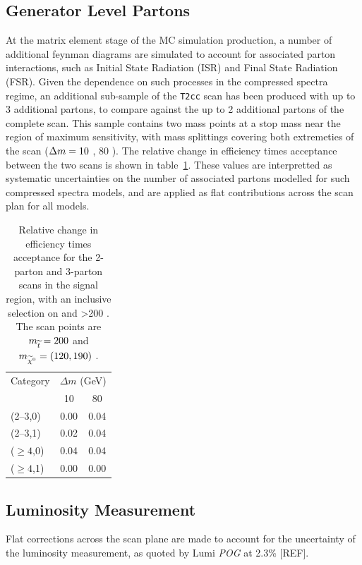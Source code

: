 \subsection{Generator Level Partons}
At the \MADGRAPH matrix element stage of the MC simulation production, a number
of additional feynman diagrams are simulated to account for associated parton 
interactions, such as Initial State Radiation (ISR) and Final State Radiation
(FSR). Given the dependence on such processes in the
compressed spectra regime, an additional sub-sample of the \texttt{T2cc} scan 
has been produced with up to 3 additional partons, to compare against the up to
2 additional partons of the complete scan. This sample contains two mass points 
at a stop mass near the region of maximum sensitivity, with mass splittings 
covering both extremeties of the scan ($\Delta m = 10$ \gev, 80 \gev). The relative
change in efficiency times 
acceptance between the two scans is shown in table~\ref{tab:sms-t2cc-2v3part}. 
These values are interpretted as systematic uncertainties on the number of 
associated partons modelled for such compressed spectra models, and are applied 
as flat contributions across the scan plan for all models.

\begin{table}[!h]
  \caption{Relative change in efficiency times acceptance for the
    2-parton and 3-parton scans in the signal region, with an inclusive 
    selection on \nb and \HT>200 \gev. The scan points are $m_{\widetilde{t}} = 200$ \gev 
    and $m_{\widetilde{\chi}^{0}} = (120, 190)$ \gev.}
  \label{tab:sms-t2cc-2v3part}
  \centering
  \small
  \begin{tabular}{ lcc }
    \hline
    \hline
    Category     & \multicolumn{2}{c}{$\Delta m$ (GeV)} \\
    \cline{2-3}
                 & 10   & 80                            \\
    \hline
    (2--3,0)     & 0.00 & 0.04                          \\
    (2--3,1)     & 0.02 & 0.04                          \\
    ($\geq 4$,0) & 0.04 & 0.04                          \\
    ($\geq 4$,1) & 0.00 & 0.00                          \\
    \hline
    \hline
  \end{tabular}
\end{table}


\subsection{Luminosity Measurement}
Flat corrections across the scan plane are made to account for the uncertainty 
of the luminosity measurement, as quoted by Lumi \emph{POG} at 2.3\% [REF].

